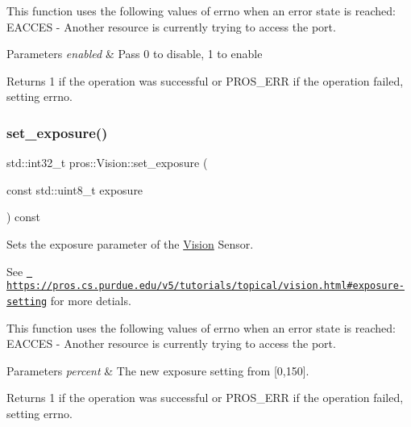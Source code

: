 This function uses the following values of errno when an error state is reached\+: E\+A\+C\+C\+ES -\/ Another resource is currently trying to access the port.


\begin{DoxyParams}{Parameters}
{\em enabled} & Pass 0 to disable, 1 to enable\\
\hline
\end{DoxyParams}
\begin{DoxyReturn}{Returns}
1 if the operation was successful or P\+R\+O\+S\+\_\+\+E\+RR if the operation failed, setting errno. 
\end{DoxyReturn}
\mbox{\label{classpros_1_1Vision_a2ad6faaad1abb936f52022022611ac7f}} 
\subsubsection{\texorpdfstring{set\_exposure()}{set\_exposure()}}
{\footnotesize\ttfamily std\+::int32\+\_\+t pros\+::\+Vision\+::set\+\_\+exposure (\begin{DoxyParamCaption}\item[{const std\+::uint8\+\_\+t}]{exposure }\end{DoxyParamCaption}) const}



Sets the exposure parameter of the \mbox{\hyperlink{classpros_1_1Vision}{Vision}} Sensor. 

See \href{https://pros.cs.purdue.edu/v5/tutorials/topical/vision.html\#exposure-setting}{\texttt{ https\+://pros.\+cs.\+purdue.\+edu/v5/tutorials/topical/vision.\+html\#exposure-\/setting}} for more detials.

This function uses the following values of errno when an error state is reached\+: E\+A\+C\+C\+ES -\/ Another resource is currently trying to access the port.


\begin{DoxyParams}{Parameters}
{\em percent} & The new exposure setting from \mbox{[}0,150\mbox{]}.\\
\hline
\end{DoxyParams}
\begin{DoxyReturn}{Returns}
1 if the operation was successful or P\+R\+O\+S\+\_\+\+E\+RR if the operation failed, setting errno. 
\end{DoxyReturn}
\mbox{\label{classpros_1_1Vision_ada3f1fdd2cc24c15af26bdd7c17bf604}} 
